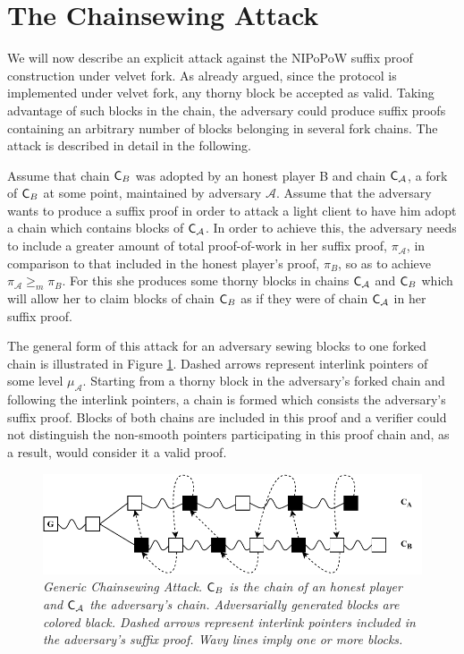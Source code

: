\section{The Chainsewing Attack}
We  will now describe an explicit attack against the NIPoPoW suffix proof construction under velvet fork. As already argued, since the protocol is implemented under velvet fork, any thorny block be accepted as valid. Taking advantage of such blocks in the chain, the adversary could produce suffix proofs containing an arbitrary number of blocks belonging in several fork chains. The attack is described in detail in the following.

Assume that chain $\mathsf{C}_B$ was adopted by an honest player B and chain $\mathsf{C}_\mathcal{A}$, a fork of $\mathsf{C}_B$ at some point, maintained by adversary $\mathcal{A}$. Assume that the adversary wants to produce a suffix  proof in order to attack a light client to have him adopt a chain which contains blocks of $\mathsf{C}_\mathcal{A}$. In order to achieve this, the adversary needs to include a greater amount of total proof-of-work in her suffix proof, $\pi_\mathcal{A}$, in comparison to that included in the honest player's proof, $\pi_B$, so as to achieve $\pi_\mathcal{A} \geq_m \pi_B$. For this she produces some thorny blocks in chains $\mathsf{C}_\mathcal{A}$ and $\mathsf{C}_B$ which will allow her to claim blocks of chain $\mathsf{C}_B$ as if they were of chain $\mathsf{C}_\mathcal{A}$ in her suffix proof.

The general form of this attack for an adversary sewing blocks to one forked chain is illustrated in Figure \ref{fig:generic_attack}. Dashed arrows represent interlink pointers of some level $\mu_\mathcal{A}$. Starting from a thorny block in the adversary's forked chain and following the interlink pointers, a chain is formed which consists the adversary's suffix proof. Blocks of both chains are included in this proof and a verifier could not distinguish the non-smooth pointers participating in this proof chain and, as a result, would consider it a valid proof.

\begin{figure}[h]
	\begin{center}
		\includegraphics[scale=0.63
		]{figures/generic_chainsewing_attack.pdf}
	\end{center}
	\caption{\textit{Generic Chainsewing Attack. $\mathsf{C}_B$ is the chain of an honest 	player and $\mathsf{C}_\mathcal{A}$ the adversary's chain. Adversarially generated blocks are 	colored black. Dashed arrows represent interlink pointers included in the 	adversary's suffix proof. Wavy lines imply one or more blocks.}}
	\label{fig:generic_attack}
\end{figure}

